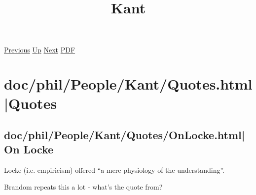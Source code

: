 \documentclass[12pt,a4paper]{report}
\begin{document}
 \href{doc/phil/People/Brandom.html}{Previous} 
 \href{doc/phil/People.html}{Up} 
 \href{doc/phil/People/Sellars.html}{Next} 
 \href{doc/phil/People/Kant.pdf}{PDF} 
\title{Kant}

\tableofcontents

\part{doc/phil/People/Kant/Quotes.html|Quotes}

\chapter{doc/phil/People/Kant/Quotes/OnLocke.html|On Locke}
Locke (i.e. empiricism) offered ``a mere physiology of the understanding''.

Brandom repeats this a lot - what's the quote from?
\end{document}
